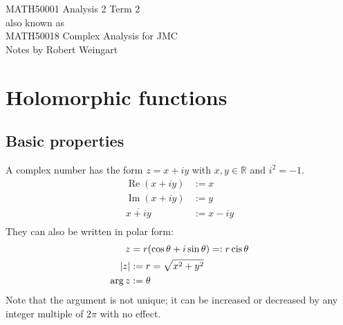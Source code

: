 \documentclass[12pt]{article}
\theoremstyle{definition}
\newcommand{\R}{\mathbb{R}}
\DeclarePairedDelimiter\abs{\lvert}{\rvert}
\DeclareMathOperator{\re}{Re}
\DeclareMathOperator{\im}{Im}
\DeclareMathOperator{\cis}{cis}
\begin{document}

\begin{titlepage}
  \vspace*{\fill}
  \begin{center}
    {\Huge MATH50001 Analysis 2 Term 2}\\
    \vspace{0.5cm}
    {\Large also known as}\\
    \vspace{0.5cm}
    {\Huge MATH50018 Complex Analysis for JMC}\\
    \vspace{1cm}
    {\Large Notes by Robert Weingart}
  \end{center}
  \vspace*{\fill}
\end{titlepage}

\newpage

\tableofcontents


\section{Holomorphic functions}


\subsection{Basic properties}

A complex number has the form $z = x + iy$ with $x, y \in \R$ and $i^2 = -1$.
\begin{align*}
  \re{(x + iy)} &:= x\\
  \im{(x + iy)} &:= y\\
  \overline{x + iy} &:= x - iy\\
\end{align*}
They can also be written in polar form:
\begin{align*}
  z &= r(\cos{\theta} + i\sin{\theta}) =: r\cis{\theta}\\
  \abs{z} &:= r = \sqrt{x^2 + y^2}\\
  \arg{z} &:= \theta
\end{align*}
Note that the argument is not unique; it can be increased or decreased by any integer multiple of $2\pi$ with no effect.
\end{document}
